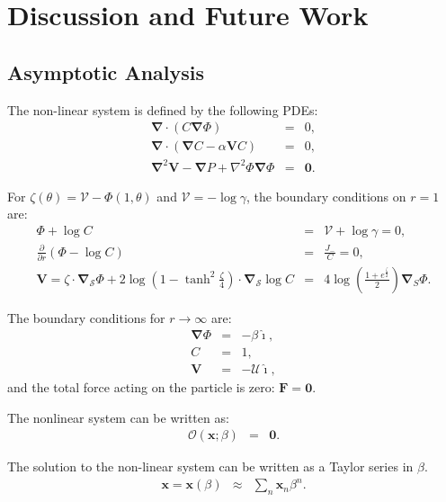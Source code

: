 \documentclass[final]{elsarticle}
\newcommand{\deriv}[2]{\frac{\partial #1}{\partial #2}}
\newcommand{\pars}[1]{\left(#1\right)}
\newcommand\Laplacian{\nabla^2}
\newcommand\bnabla{\boldsymbol{\nabla}}
\newcommand\bLaplacian{\boldsymbol{\nabla}^2}
\newcommand\bV{\boldsymbol{V}}
\newcommand\bF{\boldsymbol{F}}
\newcommand\bx{\boldsymbol{x}}
\newcommand\bzero{\boldsymbol{0}}
\newcommand\cO{\mathcal{O}}
\newcommand\cU{\mathscr{U}}
\newcommand\cV{\mathscr{V}}
\newcommand\ui{\boldsymbol{\hat{\imath}}}
\begin{document}
\section{Discussion and Future Work} \label{sec:discussion}

\begin{appendix}
\section{Asymptotic Analysis} \label{sec:asymp}
The non-linear system is defined by the following PDEs:
\label{PDEs}
\begin{eqnarray*}
\bnabla \cdot \pars{C \bnabla \varPhi} &=& 0, \\
\bnabla \cdot \pars{\bnabla C - \alpha \bV C} &=& 0, \\
\bLaplacian \bV - \bnabla P + \Laplacian \varPhi \bnabla \varPhi &=& \bzero.
\end{eqnarray*}

For $\zeta(\theta) = \cV - \varPhi(1, \theta)$ and 
$\cV = -\log \gamma$, the boundary conditions on $r = 1$ are:
\begin{eqnarray*}
\varPhi + \log C &=& \cV + \log \gamma = 0, \\
\deriv{}{r}\pars{\varPhi - \log C} &=& \frac{J_-}{C} = 0, \\
\bV = \zeta \cdot \bnabla_\mathcal{S} \varPhi 
+ 2\log\pars{1-\tanh^2\frac{\zeta}{4}} \cdot \bnabla_\mathcal{S} \log C
&=& 4\log\pars{\frac{1 + e^\frac{\zeta}{2}}{2}} \bnabla_S \varPhi.
\end{eqnarray*}

The boundary conditions for $r \rightarrow \infty$ are:
\begin{eqnarray*}
\bnabla \varPhi &=& -\beta \ui, \\
C &=& 1, \\
\bV &=& -\cU \ui,
\end{eqnarray*}
and the total force acting on the particle is zero: $\bF = \bzero$.

The nonlinear system can be written as: 
\begin{eqnarray*}
\cO(\bx;\beta) &=& \bzero.
\end{eqnarray*}

The solution to the non-linear system can be written as a Taylor series in $\beta$.
\begin{eqnarray*}
\bx = \bx(\beta) &\approx& \sum_n \bx_n \beta^n.
\end{eqnarray*}


\end{appendix}
\end{document}
